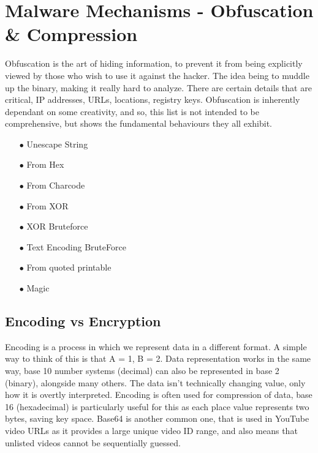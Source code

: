 
\chapter{Malware Mechanisms - Obfuscation \& Compression}
Obfuscation is the art of hiding information, to prevent it from being explicitly viewed by those who wish to use it against the hacker. The idea being to muddle up the binary, making it really hard to analyze. There are certain details that are critical, IP addresses, URLs, locations, registry keys. Obfuscation is inherently dependant on some creativity, and so,
this list is not intended to be comprehensive, but shows the fundamental behaviours they all exhibit.
\begin{enumerate}
    \item [$\bullet$] Unescape String
    \item [$\bullet$] From Hex
    \item [$\bullet$] From Charcode
    \item [$\bullet$] From XOR
    \item [$\bullet$] XOR Bruteforce
    \item [$\bullet$] Text Encoding BruteForce
    \item [$\bullet$] From quoted printable
    \item [$\bullet$] Magic
\end{enumerate}


\section{Encoding vs Encryption}
Encoding is a process in which we represent data in a different format. A simple way to think of this is that A = 1, B = 2. Data representation works in the same way,
base 10 number systems (decimal) can also be represented in base 2 (binary), alongside many others. The data isn't technically changing value, only how it is overtly interpreted.
Encoding is often used for compression of data, base 16 (hexadecimal) is particularly useful for this as each place value represents two bytes, saving key space. Base64 is another common one, that is used in
YouTube video URLs as it provides a large unique video ID range, and also means that unlisted videos cannot be sequentially guessed.

